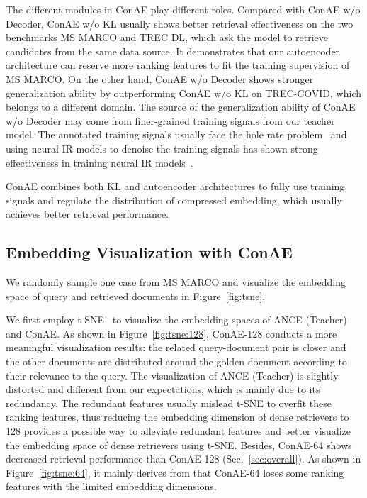 \documentclass[11pt]{article}
\begin{document}
 
The different modules in ConAE play different roles. Compared with ConAE w/o Decoder, ConAE w/o KL usually shows better retrieval effectiveness on the two benchmarks MS MARCO and TREC DL, which ask the model to retrieve candidates from the same data source. It demonstrates that our autoencoder architecture can reserve more ranking features to fit the training supervision of MS MARCO. On the other hand, ConAE w/o Decoder shows stronger generalization ability by outperforming ConAE w/o KL on TREC-COVID, which belongs to a different domain. The source of the generalization ability of ConAE w/o Decoder may come from finer-grained training signals from our teacher model. The annotated training signals usually face the hole rate problem~\cite{xiong2020cmt} and using neural IR models to denoise the training signals has shown strong effectiveness in training neural IR models~\cite{DBLP:conf/naacl/QuDLLRZDWW21}.

ConAE combines both KL and autoencoder architectures to fully use training signals and regulate the distribution of compressed embedding, which usually achieves better retrieval performance.





\subsection{Embedding Visualization with ConAE}
We randomly sample one case from MS MARCO and visualize the embedding space of query and retrieved documents in Figure~\ref{fig:tsne}.

We first employ t-SNE~\cite{van2008visualizing} to visualize the embedding spaces of ANCE (Teacher) and ConAE. As shown in Figure~\ref{fig:tsne:128}, ConAE-128 conducts a more meaningful visualization results: the related query-document pair is closer and the other documents are distributed around the golden document according to their relevance to the query. The visualization of ANCE (Teacher) is slightly distorted and different from our expectations, which is mainly due to its redundancy. The redundant features usually mislead t-SNE to overfit these ranking features, thus reducing the embedding dimension of dense retrievers to 128 provides a possible way to alleviate redundant features and better visualize the embedding space of dense retrievers using t-SNE. Besides, ConAE-64 shows decreased retrieval performance than ConAE-128 (Sec.~\ref{sec:overall}).
As shown in Figure~\ref{fig:tsne:64}, it mainly derives from that ConAE-64 loses some ranking features with the limited embedding dimensions. 
\end{document}
